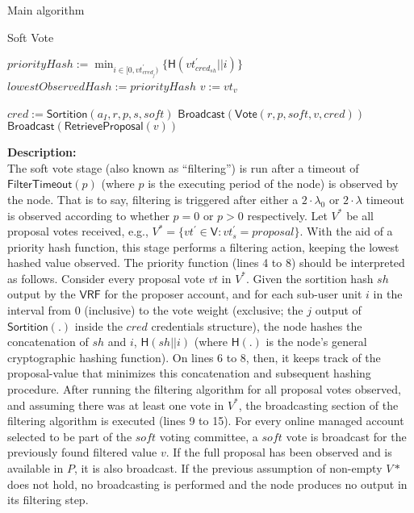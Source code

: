 \documentclass[10pt,a4paper]{article}
\begin{document}
\begin{section}{Main algorithm}
\begin{subsection}{Soft Vote}
\begin{algorithm}[H]
\begin{algorithmic}[1]
        \State $priorityHash := \min_{i \in [0, vt^\prime_{cred_j})} \{ \mathsf{H}(vt^\prime_{cred_{sh}} || i)\}$
            \State $lowestObservedHash := priorityHash$
            \State $v := vt_v$
        \EndIf    
    \EndFor

            \State $cred := \mathsf{Sortition}(a_I, r, p, s, soft)$
                \State $\mathsf{Broadcast}(\mathsf{Vote}(r, p, soft, v, cred))$
                    \State $\mathsf{Broadcast}(\mathsf{RetrieveProposal}(v))$
                \EndIf
            \EndIf
        \EndFor
    \EndIf

    \EndFunction
    \end{algorithmic}
\end{algorithm}

\noindent \textbf{Description:}\\
The soft vote stage (also known as ``filtering'') is run after a timeout of $\mathsf{FilterTimeout}(p)$
(where $p$ is the executing period of the node) is observed by the node. 
That is to say, filtering is triggered after either a $2\cdot\lambda_0$ or $2\cdot\lambda$ timeout is observed according 
to whether $p=0$ or $p>0$ respectively.
Let $V^*$ be all proposal votes received, e.g., $V^*=\{vt^\prime\in \mathsf{V} : vt^\prime_s = proposal\}$.
With the aid of a priority hash function, this stage performs a filtering action,
keeping the lowest hashed value observed.
The priority function (lines 4 to 8) should be interpreted as follows. Consider every proposal vote $vt$ in $V^*$.
Given the sortition hash $sh$ output by the $\mathsf{VRF}$ for the proposer account, and for each sub-user unit $i$ 
in the interval from $0$ (inclusive) to the vote weight (exclusive; the $j$ output of $\mathsf{Sortition}(.)$ inside 
the $cred$ credentials structure), the node hashes the concatenation of $sh$ and $i$, $\mathsf{H}(sh||i)$ 
(where $\mathsf{H}(.)$ is the node's general cryptographic hashing function). On lines 6 to 8, 
then, it keeps track of the proposal-value that minimizes this concatenation and subsequent hashing procedure.
After running the filtering algorithm for all proposal votes observed, and assuming there was at least one vote
in $V^*$, the broadcasting section of the filtering algorithm is executed (lines 9 to 15).
For every online managed account selected to be part of the $soft$ voting committee, a $soft$ vote is
broadcast for the previously found filtered value $v$. If the full proposal has been observed and is available in $P$,
it is also broadcast. 
If the previous assumption of non-empty $V*$ does not hold, no broadcasting is performed and the node produces no
output in its filtering step.


\end{subsection}
\end{section}
\end{document}
